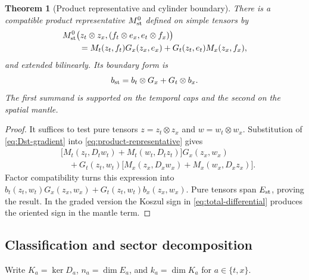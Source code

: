 \documentclass[11pt,a4paper]{article}
\newtheorem{theorem}{Theorem}[section]
\begin{document}
\begin{theorem}[Product representative and cylinder boundary]
\label{thm:product-representative}
There is a compatible product representative \(M_{\rm st}^0\) defined on
simple tensors by
\begin{align}
 &M_{\rm st}^0
 \bigl(z_t\otimes z_x,
       (f_t\otimes e_x,e_t\otimes f_x)\bigr)\notag\\
 &\qquad=
 M_t(z_t,f_t)G_x(z_x,e_x)
 +G_t(z_t,e_t)M_x(z_x,f_x),
 \label{eq:product-representative}
\end{align}
and extended bilinearly.  Its boundary form is
\begin{equation}\label{eq:product-boundary}
 b_{\rm st}=b_t\otimes G_x+G_t\otimes b_x.
\end{equation}
The first summand is supported on the temporal caps and the second on the
spatial mantle.
\end{theorem}

\begin{proof}
It suffices to test pure tensors \(z=z_t\otimes z_x\) and
\(w=w_t\otimes w_x\).  Substitution of \cref{eq:Dst-gradient} into
\cref{eq:product-representative} gives
\begin{align*}
 &\bigl[M_t(z_t,D_tw_t)+M_t(w_t,D_tz_t)\bigr]
   G_x(z_x,w_x)\\
 &\quad+G_t(z_t,w_t)
   \bigl[M_x(z_x,D_xw_x)+M_x(w_x,D_xz_x)\bigr].
\end{align*}
Factor compatibility turns this expression into
\(b_t(z_t,w_t)G_x(z_x,w_x)+G_t(z_t,w_t)b_x(z_x,w_x)\).
Pure tensors span \(E_{\rm st}\), proving the result.  In the graded
version the Koszul sign in \cref{eq:total-differential} produces the
oriented sign in the mantle term.
\end{proof}

\subsection{Classification and sector decomposition}

Write \(K_a=\ker D_a\), \(n_a=\dim E_a\), and
\(k_a=\dim K_a\) for \(a\in\{t,x\}\).
\end{document}
